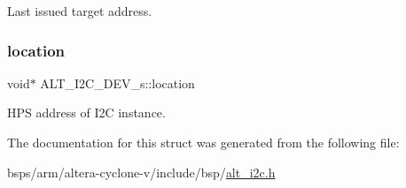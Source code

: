 Last issued target address. \mbox{\label{structALT__I2C__DEV__s_a794e8b87a3cf07b79de962de213011da}} 
\subsubsection{\texorpdfstring{location}{location}}
{\footnotesize\ttfamily void$\ast$ A\+L\+T\+\_\+\+I2\+C\+\_\+\+D\+E\+V\+\_\+s\+::location}

H\+PS address of I2C instance. 

The documentation for this struct was generated from the following file\+:\begin{DoxyCompactItemize}
\item 
bsps/arm/altera-\/cyclone-\/v/include/bsp/\mbox{\hyperlink{alt__i2c_8h}{alt\+\_\+i2c.\+h}}\end{DoxyCompactItemize}

